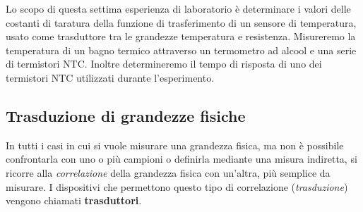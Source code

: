 \documentclass[italian,12pt,a4paper,oneside,final]{report}
\begin{document}
Lo scopo di questa settima esperienza di laboratorio è determinare i valori delle costanti di taratura della funzione di trasferimento di un sensore di temperatura, usato come trasduttore tra le grandezze temperatura e resistenza.
Misureremo la temperatura di un bagno termico attraverso un termometro ad alcool e una serie di termistori NTC.
Inoltre determineremo il tempo di risposta di uno dei termistori NTC utilizzati durante l'esperimento.

\subsection{Trasduzione di grandezze fisiche}
In tutti i casi in cui si vuole misurare una grandezza fisica, ma non è possibile confrontarla con uno o più campioni o definirla mediante una misura indiretta, si ricorre alla \emph{correlazione} della grandezza fisica con un’altra, più semplice da misurare.
I dispositivi che permettono questo tipo di correlazione (\emph{trasduzione}) vengono chiamati \textbf{trasduttori}.
\end{document}
